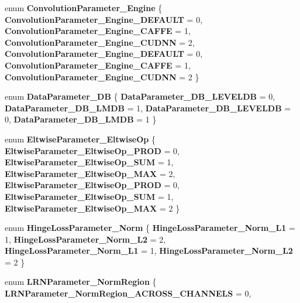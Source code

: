 \begin{DoxyCompactItemize}
enum {\bfseries Convolution\+Parameter\+\_\+\+Engine} \{ \newline
{\bfseries Convolution\+Parameter\+\_\+\+Engine\+\_\+\+D\+E\+F\+A\+U\+LT} = 0, 
{\bfseries Convolution\+Parameter\+\_\+\+Engine\+\_\+\+C\+A\+F\+FE} = 1, 
{\bfseries Convolution\+Parameter\+\_\+\+Engine\+\_\+\+C\+U\+D\+NN} = 2, 
{\bfseries Convolution\+Parameter\+\_\+\+Engine\+\_\+\+D\+E\+F\+A\+U\+LT} = 0, 
\newline
{\bfseries Convolution\+Parameter\+\_\+\+Engine\+\_\+\+C\+A\+F\+FE} = 1, 
{\bfseries Convolution\+Parameter\+\_\+\+Engine\+\_\+\+C\+U\+D\+NN} = 2
 \}
\item 
\mbox{\label{namespacecaffe_a3f504378790e796a9c104d7632889c1a}} 
enum {\bfseries Data\+Parameter\+\_\+\+DB} \{ {\bfseries Data\+Parameter\+\_\+\+D\+B\+\_\+\+L\+E\+V\+E\+L\+DB} = 0, 
{\bfseries Data\+Parameter\+\_\+\+D\+B\+\_\+\+L\+M\+DB} = 1, 
{\bfseries Data\+Parameter\+\_\+\+D\+B\+\_\+\+L\+E\+V\+E\+L\+DB} = 0, 
{\bfseries Data\+Parameter\+\_\+\+D\+B\+\_\+\+L\+M\+DB} = 1
 \}
\item 
\mbox{\label{namespacecaffe_aa66d3ac81476392e5c6fd34c1115fe41}} 
enum {\bfseries Eltwise\+Parameter\+\_\+\+Eltwise\+Op} \{ \newline
{\bfseries Eltwise\+Parameter\+\_\+\+Eltwise\+Op\+\_\+\+P\+R\+OD} = 0, 
{\bfseries Eltwise\+Parameter\+\_\+\+Eltwise\+Op\+\_\+\+S\+UM} = 1, 
{\bfseries Eltwise\+Parameter\+\_\+\+Eltwise\+Op\+\_\+\+M\+AX} = 2, 
{\bfseries Eltwise\+Parameter\+\_\+\+Eltwise\+Op\+\_\+\+P\+R\+OD} = 0, 
\newline
{\bfseries Eltwise\+Parameter\+\_\+\+Eltwise\+Op\+\_\+\+S\+UM} = 1, 
{\bfseries Eltwise\+Parameter\+\_\+\+Eltwise\+Op\+\_\+\+M\+AX} = 2
 \}
\item 
\mbox{\label{namespacecaffe_a2fc3a666d590e3b2212b2b436c2b805b}} 
enum {\bfseries Hinge\+Loss\+Parameter\+\_\+\+Norm} \{ {\bfseries Hinge\+Loss\+Parameter\+\_\+\+Norm\+\_\+\+L1} = 1, 
{\bfseries Hinge\+Loss\+Parameter\+\_\+\+Norm\+\_\+\+L2} = 2, 
{\bfseries Hinge\+Loss\+Parameter\+\_\+\+Norm\+\_\+\+L1} = 1, 
{\bfseries Hinge\+Loss\+Parameter\+\_\+\+Norm\+\_\+\+L2} = 2
 \}
\item 
\mbox{\label{namespacecaffe_addc128ae9c954b2ed118b08114995770}} 
enum {\bfseries L\+R\+N\+Parameter\+\_\+\+Norm\+Region} \{ {\bfseries L\+R\+N\+Parameter\+\_\+\+Norm\+Region\+\_\+\+A\+C\+R\+O\+S\+S\+\_\+\+C\+H\+A\+N\+N\+E\+LS} = 0, 

\end{DoxyCompactItemize}
